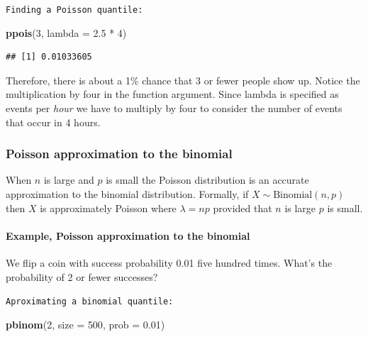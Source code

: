 \documentclass[]{article}
\newenvironment{Shaded}{\begin{snugshade}}{\end{snugshade}}
\newcommand{\KeywordTok}[1]{\textcolor[rgb]{0.13,0.29,0.53}{\textbf{{#1}}}}
\newcommand{\DataTypeTok}[1]{\textcolor[rgb]{0.13,0.29,0.53}{{#1}}}
\newcommand{\DecValTok}[1]{\textcolor[rgb]{0.00,0.00,0.81}{{#1}}}
\newcommand{\FloatTok}[1]{\textcolor[rgb]{0.00,0.00,0.81}{{#1}}}
\newcommand{\StringTok}[1]{\textcolor[rgb]{0.31,0.60,0.02}{{#1}}}
\newcommand{\NormalTok}[1]{{#1}}
\begin{document}
\verb;Finding a Poisson quantile:;

\begin{Shaded}
\begin{Highlighting}[]
\KeywordTok{ppois}\NormalTok{(}\DecValTok{3}\NormalTok{, }\DataTypeTok{lambda =} \FloatTok{2.5} \NormalTok{*}\StringTok{ }\DecValTok{4}\NormalTok{)}
\end{Highlighting}
\end{Shaded}

\begin{verbatim}
## [1] 0.01033605
\end{verbatim}

Therefore, there is about a 1\% chance that 3 or fewer people show up.
Notice the multiplication by four in the function argument. Since lambda
is specified as events per \emph{hour} we have to multiply by four to
consider the number of events that occur in 4 hours.

\subsubsection{Poisson approximation to the
binomial}\label{poisson-approximation-to-the-binomial}

When $n$ is large and $p$ is small the Poisson distribution is an
accurate approximation to the binomial distribution. Formally, if
$X \sim \mbox{Binomial}(n, p)$ then $X$ is approximately Poisson where
$\lambda = n p$ provided that $n$ is large $p$ is small.

\paragraph{Example, Poisson approximation to the
binomial}\label{example-poisson-approximation-to-the-binomial}

We flip a coin with success probability 0.01 five hundred times. What's
the probability of 2 or fewer successes?

\vspace{1pc}

\verb;Aproximating a binomial quantile:;

\begin{Shaded}
\begin{Highlighting}[]
\KeywordTok{pbinom}\NormalTok{(}\DecValTok{2}\NormalTok{, }\DataTypeTok{size =} \DecValTok{500}\NormalTok{, }\DataTypeTok{prob =} \FloatTok{0.01}\NormalTok{)}
\end{Highlighting}
\end{Shaded}
\end{document}

